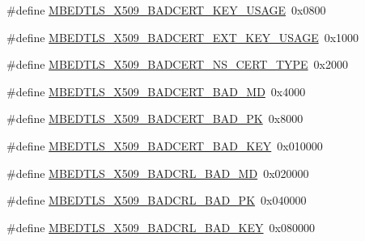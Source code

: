 \begin{DoxyCompactItemize}
\item 
\#define \mbox{\hyperlink{group__x509__module_ga28705c8c3091a013487df25842249c0f}{M\+B\+E\+D\+T\+L\+S\+\_\+\+X509\+\_\+\+B\+A\+D\+C\+E\+R\+T\+\_\+\+K\+E\+Y\+\_\+\+U\+S\+A\+GE}}~0x0800
\item 
\#define \mbox{\hyperlink{group__x509__module_gac3dab3183efdbca7e988916e7fc1a02a}{M\+B\+E\+D\+T\+L\+S\+\_\+\+X509\+\_\+\+B\+A\+D\+C\+E\+R\+T\+\_\+\+E\+X\+T\+\_\+\+K\+E\+Y\+\_\+\+U\+S\+A\+GE}}~0x1000
\item 
\#define \mbox{\hyperlink{group__x509__module_gaa383ae441177fa7a16fb2313bb48bb10}{M\+B\+E\+D\+T\+L\+S\+\_\+\+X509\+\_\+\+B\+A\+D\+C\+E\+R\+T\+\_\+\+N\+S\+\_\+\+C\+E\+R\+T\+\_\+\+T\+Y\+PE}}~0x2000
\item 
\#define \mbox{\hyperlink{group__x509__module_ga41b54b526c11bf51cc431ef1a151816d}{M\+B\+E\+D\+T\+L\+S\+\_\+\+X509\+\_\+\+B\+A\+D\+C\+E\+R\+T\+\_\+\+B\+A\+D\+\_\+\+MD}}~0x4000
\item 
\#define \mbox{\hyperlink{group__x509__module_ga9332fa1e09a373cc56234525b14546c4}{M\+B\+E\+D\+T\+L\+S\+\_\+\+X509\+\_\+\+B\+A\+D\+C\+E\+R\+T\+\_\+\+B\+A\+D\+\_\+\+PK}}~0x8000
\item 
\#define \mbox{\hyperlink{group__x509__module_gaef5f9a34b327eb79750ebc3779e98282}{M\+B\+E\+D\+T\+L\+S\+\_\+\+X509\+\_\+\+B\+A\+D\+C\+E\+R\+T\+\_\+\+B\+A\+D\+\_\+\+K\+EY}}~0x010000
\item 
\#define \mbox{\hyperlink{group__x509__module_gad3f810fb74f94164185b88b90fffa329}{M\+B\+E\+D\+T\+L\+S\+\_\+\+X509\+\_\+\+B\+A\+D\+C\+R\+L\+\_\+\+B\+A\+D\+\_\+\+MD}}~0x020000
\item 
\#define \mbox{\hyperlink{group__x509__module_ga182a6f1f465e566de7586e6ee8fa7c4e}{M\+B\+E\+D\+T\+L\+S\+\_\+\+X509\+\_\+\+B\+A\+D\+C\+R\+L\+\_\+\+B\+A\+D\+\_\+\+PK}}~0x040000
\item 
\#define \mbox{\hyperlink{group__x509__module_gac2947ead6fd1035296826110ca74a364}{M\+B\+E\+D\+T\+L\+S\+\_\+\+X509\+\_\+\+B\+A\+D\+C\+R\+L\+\_\+\+B\+A\+D\+\_\+\+K\+EY}}~0x080000
\end{DoxyCompactItemize}
